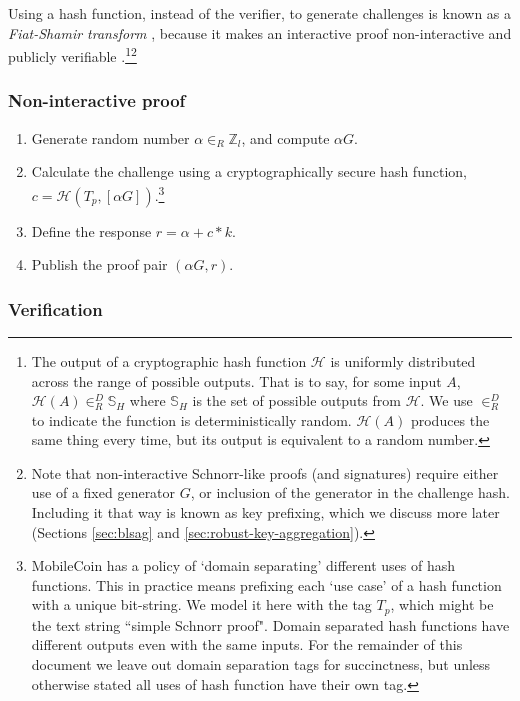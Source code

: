Using a hash function, instead of the verifier, to generate challenges is known as a {\em Fiat-Shamir transform} \cite{fiat-shamir-transform}, because it makes an interactive proof non-interactive and publicly verifiable \cite{Signatures2015BorromeanRS}.\footnote{The output of a cryptographic hash function $\mathcal{H}$ is uniformly distributed across the range of possible outputs. That is to say, for some input $A$, $\mathcal{H}(A) \in^D_R \mathbb{S}_H$ where $\mathbb{S}_H$ is the set of possible outputs from $\mathcal{H}$. We use $\in^D_R$ to indicate the function is deterministically random. $\mathcal{H}(A)$ produces the same thing every time, but its output is equivalent to a random number.
}\footnote{Note that non-interactive Schnorr-like proofs (and signatures) require either use of a fixed generator $G$, or inclusion of the generator in the challenge hash. Including it that way is known as key prefixing, which we discuss more later (Sections \ref{sec:blsag} and \ref{sec:robust-key-aggregation}).}

\subsubsection*{Non-interactive proof}

\begin{enumerate}
	\item Generate random number $\alpha \in_R \mathbb{Z}_l$, and compute $\alpha G$.
	\item Calculate the challenge using a cryptographically secure hash function, \(c = \mathcal{H}(T_p, [\alpha G])\).\footnote{MobileCoin has a policy of `domain separating' \cite{domain-separation-context-labels} different uses of hash functions. This in practice means prefixing each `use case' of a hash function with a unique bit-string. We model it here with the tag $T_p$, which might be the text string ``simple Schnorr proof". Domain separated hash functions have different outputs even with the same inputs. For the remainder of this document we leave out domain separation tags for succinctness, but unless otherwise stated all uses of hash function have their own tag.}
	\item Define the response $r = \alpha + c*k$.
	\item Publish the proof pair $(\alpha G, r)$.
\end{enumerate}

\subsubsection*{Verification}

